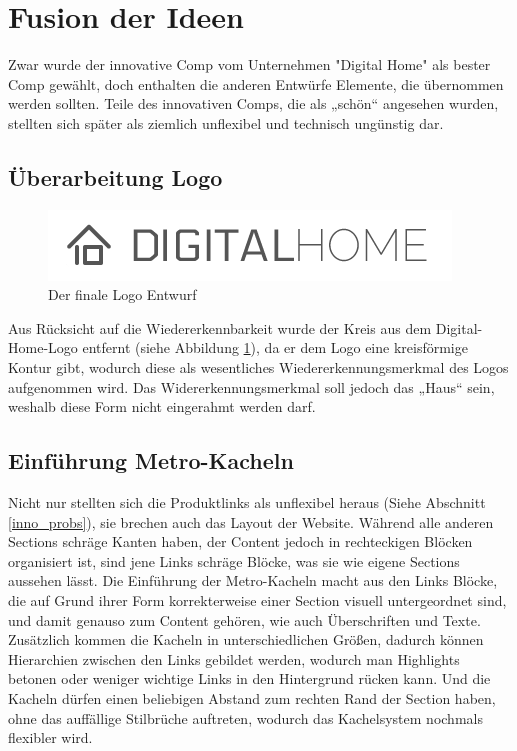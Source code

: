 \section{Fusion der Ideen}
Zwar wurde der innovative Comp vom Unternehmen "Digital Home" als bester Comp gewählt, doch enthalten die anderen Entwürfe Elemente, die übernommen werden sollten. Teile des innovativen Comps, die als „schön“ angesehen wurden, stellten sich später als ziemlich unflexibel und technisch ungünstig dar.
\subsection{Überarbeitung Logo}
\begin{figure} [tp]
\includegraphics[width=\textwidth]{./img/logo3.png}
\caption{Der finale Logo Entwurf}
\label{logo3}
\end{figure}
Aus Rücksicht auf die Wiedererkennbarkeit wurde der Kreis aus dem Digital-Home-Logo entfernt (siehe Abbildung \ref{logo3}), da er dem Logo eine kreisförmige Kontur gibt, wodurch diese als wesentliches Wiedererkennungsmerkmal des Logos aufgenommen wird. Das Widererkennungsmerkmal soll jedoch das „Haus“ sein, weshalb diese Form nicht eingerahmt werden darf.

\subsection{Einführung Metro-Kacheln}
Nicht nur stellten sich die Produktlinks als unflexibel heraus (Siehe Abschnitt \ref{inno_probs}), sie brechen auch das Layout der Website. Während alle anderen Sections schräge Kanten haben, der Content jedoch in rechteckigen Blöcken organisiert ist, sind jene Links schräge Blöcke, was sie wie eigene Sections aussehen lässt. Die Einführung der Metro-Kacheln macht aus den Links Blöcke, die auf Grund ihrer Form korrekterweise einer Section visuell untergeordnet sind, und damit genauso zum Content gehören, wie auch Überschriften und Texte. Zusätzlich kommen die Kacheln in unterschiedlichen Größen, dadurch können Hierarchien zwischen den Links gebildet werden, wodurch man Highlights betonen oder weniger wichtige Links in den Hintergrund rücken kann. Und die Kacheln dürfen einen beliebigen Abstand zum rechten Rand der Section haben, ohne das auffällige Stilbrüche auftreten, wodurch das Kachelsystem nochmals flexibler wird.

